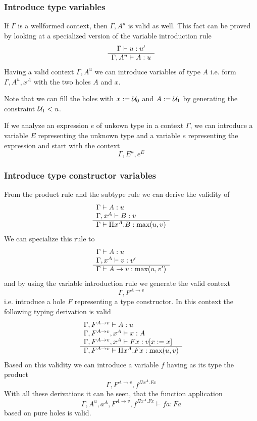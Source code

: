 \subsubsection{Introduce type variables}

If $\Gamma$ is a wellformed context, then $\Gamma, A^u$ is valid as well. This
fact can be proved by looking at a specialized version of the variable
introduction rule
%
$$
\begin{array}{c} \Gamma \vdash u: u' \\ \hline \Gamma, A^u \vdash A: u\end{array}
$$
%
Having a valid context $\Gamma,A^u$ we can introduce variables of type $A$ i.e.
form $\Gamma, A^u, x^A$ with the two holes $A$ and $x$.

Note that we can fill the holes with $x := {\cal{U}}_0$ and $A := {\cal{U}}_1$ by
generating the constraint ${\cal{U}}_1 < u$.

If we analyze an expression $e$ of unkown type in a context $\Gamma$, we can
introduce a variable $E$ representing the unknown type and a variable $e$
representing the expression and start with the context
%
$$
\Gamma, E^u, e^E
$$




\subsubsection{Introduce type constructor variables}

From the product rule and the subtype rule we can derive the validity of
%
$$
\begin{array}{l} 
    \Gamma \vdash A: u
    \\
    \Gamma, x^A \vdash B: v
 \\ \hline 
    \Gamma \vdash \Pi x^A. B : \text{max}(u, v)
\end{array}
$$
%
We can specialize this rule to
%
$$
\begin{array}{l} 
    \Gamma \vdash A: u
    \\
    \Gamma, x^A \vdash v: v'
 \\ \hline 
    \Gamma \vdash A \to v : \text{max}(u,v')
\end{array}
$$
and by using the variable introduction rule we generate the valid context
%
$$
\Gamma, F^{A \to v}
$$
i.e. introduce a hole $F$ representing a type constructor. In this context the
following typing derivation is valid
%
$$
\begin{array}{l} 
    \Gamma, F^{A \to v} \vdash A : u
    \\
    \Gamma, F^{A \to v}, x^A \vdash x: A
    \\
    \Gamma, F^{A \to v}, x^A \vdash F x: v[x := x]
 \\ \hline 
    \Gamma, F^{A \to v} \vdash \Pi x^A. F x: \text{max}(u, v)
\end{array}
$$
%
Based on this validity we can introduce a variable $f$ having as its type the
product
$$
\Gamma, F^{A \to v}, f^{\Pi x^A. F x}
$$
%
With all these derivations it can be seen, that the function application
$$
\Gamma, A^u, a^A, F^{A \to v}, f^{\Pi x^A. F x} \vdash f a: F a
$$
%
based on pure holes is valid.





